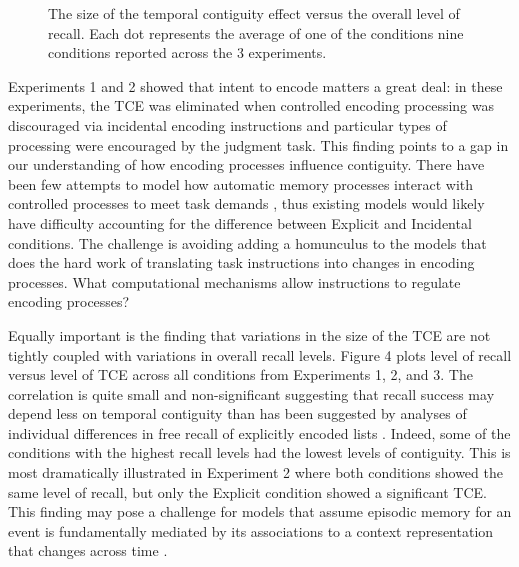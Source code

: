 \documentclass[man,natbib,floatsintext]{apa6} %
\begin{document}
\begin{figure}%
\caption{The size of the temporal contiguity effect versus the overall level of recall. Each dot represents the average of one of the conditions nine conditions reported across the 3 experiments.}
\label{corr}
\end{figure}

Experiments 1 and 2 showed that intent to encode matters a great deal: in these experiments, the TCE was eliminated when controlled encoding processing was discouraged via incidental encoding instructions and particular types of processing were encouraged by the judgment task. This finding points to a gap in our understanding of how encoding processes influence contiguity. There have been few attempts to model how automatic memory processes interact with controlled processes to meet task demands \citep{LehmMalm13,PolyEtal09}, thus existing models would likely have difficulty accounting for the difference between Explicit and Incidental conditions. The challenge is avoiding adding a homunculus to the models that does the hard work of translating task instructions into changes in encoding processes. What computational mechanisms allow instructions to regulate encoding processes?

Equally important is the finding that variations in the size of the TCE are not tightly coupled with variations in overall recall levels. Figure 4 plots level of recall versus level of TCE across all conditions from Experiments 1, 2, and 3. \label{done-12} \color{red} The correlation is quite small and non-significant \color{black} suggesting that recall success may depend less on temporal contiguity than has been suggested by analyses of individual differences in free recall of explicitly encoded lists \citep{SedeEtal10,HealEtal14}. Indeed, some of the conditions with the highest recall levels had the lowest levels of contiguity. This is most dramatically illustrated in Experiment 2 where both conditions showed the same level of recall, but only the Explicit condition showed a significant TCE. This finding may pose a challenge for models that assume episodic memory for an event is fundamentally mediated by its associations to a context representation that changes across time \citep[e.g.,][]{LohnEtal14,HealKaha15}. 
\end{document}
